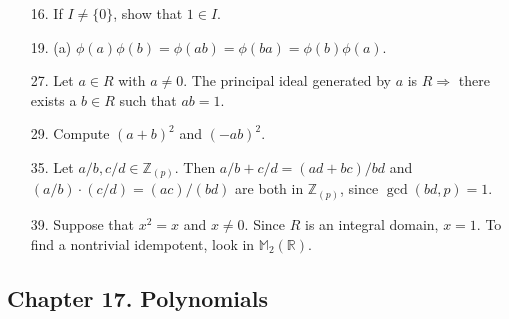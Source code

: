 {\begin{itemize}
 
\item[16.]
If $I \neq \{ 0 \}$, show that $1 \in I$.
 
\item[19.]
(a) $\phi(a) \phi(b) = \phi(ab) = \phi(ba) = \phi(b) \phi(a)$.
 
\item[27.] 
Let $a \in R$ with $a \neq 0$. The principal ideal generated by $a$ is $R
\Rightarrow$ there exists a $b \in R$ such that $ab =1$.
 
 
\item[29.]
Compute $(a+b)^2$ and $(-ab)^2$.
 
 
\item[35.]
Let $a/b, c/d \in {\mathbb Z}_{(p)}$. Then \mbox{$a/b + c/d = (ad +
bc)/bd$} and $(a/b) \cdot (c/d) = (ac)/(bd)$ are both in ${\mathbb
Z}_{(p)}$, since $\gcd(bd,p)=1$.  

 
\item[39.]
Suppose that $x^2 = x$ and $x \neq 0$. Since $R$ is an integral
domain, $x = 1$. To find a nontrivial idempotent, look in ${\mathbb
M}_2({\mathbb R})$.
 
 
 
\end{itemize}
}
 
\subsection*{Chapter 17. Polynomials}
 
